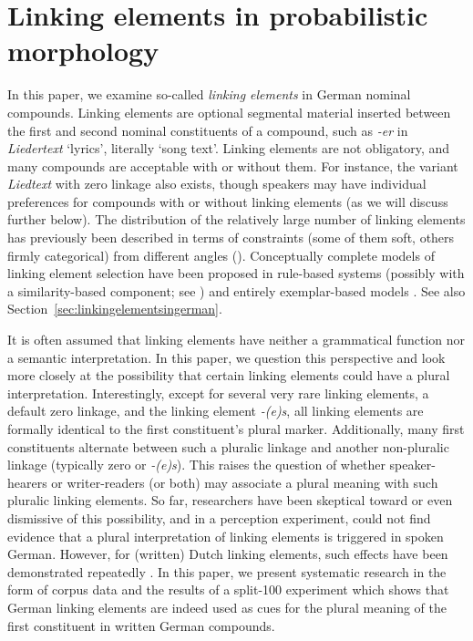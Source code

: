 \section{Linking elements in probabilistic morphology}
\label{sec:linkingelementsinprobabilisticmorphology}

In this paper, we examine so-called \textit{linking elements} in German nominal compounds.
Linking elements are optional segmental material inserted between the first and second nominal constituents of a compound, such as \textit{-er} in \textit{Liedertext} `lyrics', literally `song text'.
Linking elements are not obligatory, and many compounds are acceptable with or without them.
For instance, the variant \textit{Liedtext} with zero linkage also exists, though speakers may have individual preferences for compounds with or without linking elements (as we will discuss further below).
The distribution of the relatively large number of linking elements has previously been described in terms of constraints (some of them soft, others firmly categorical) from different angles (\egg \citealt{Fuhrhop1996,Wegener2003,Schluecker2012,NueblingSzczepaniak2013,FuhrhopKuerschner2015}).
Conceptually complete models of linking element selection have been proposed in rule-based systems (possibly with a similarity-based component; see \citealt{DresslerEa2001}) and entirely exemplar-based models \parencite{KrottEa2007}.
See also Section~\ref{sec:linkingelementsingerman}.

It is often assumed that linking elements have neither a grammatical function nor a semantic interpretation.
In this paper, we question this perspective and look more closely at the possibility that certain linking elements could have a plural interpretation.
Interestingly, except for several very rare linking elements, a default zero linkage, and the linking element \textit{-(e)s}, all linking elements are formally identical to the first constituent's plural marker.
Additionally, many first constituents alternate between such a pluralic linkage and another non-pluralic linkage (typically zero or \textit{-(e)s}).
This raises the question of whether speaker-hearers or writer-readers (or both) may associate a plural meaning with such pluralic linking elements.
So far, researchers have been skeptical toward or even dismissive of this possibility, and in a perception experiment, \textcite{KoesterEa2004} could not find evidence that a plural interpretation of linking elements is triggered in spoken German.
However, for (written) Dutch linking elements, such effects have been demonstrated repeatedly \parencite{SchreuderEa1998,BangaEa2012,BangaEa2013a,BangaEa2013b}.
In this paper, we present systematic research in the form of corpus data and the results of a split-100 experiment which shows that German linking elements are indeed used as cues for the plural meaning of the first constituent in written German compounds.

